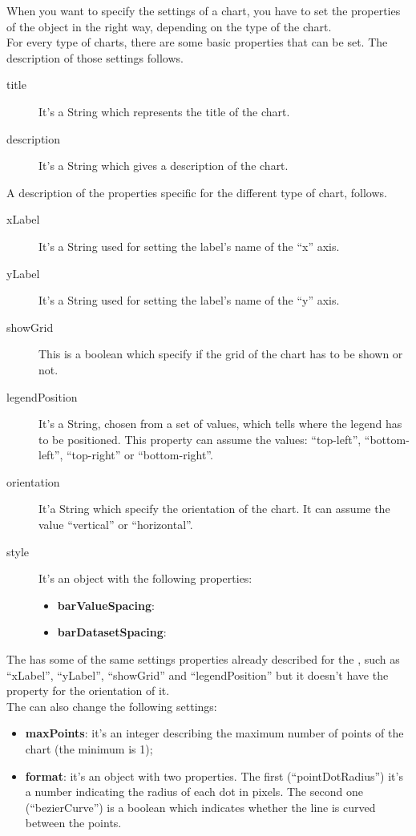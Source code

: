 	When you want to specify the settings of a chart, you have to set the properties of the  object in the right way, depending on the type of the chart.\\
	For every type of charts, there are some basic properties that can be set. The description of those settings follows.
	\begin{description}
			\item[title] It's a String which represents the title of the chart.
			\item[description] It's a String which gives a description of the chart.
	\end{description}
	A description of the properties specific for the different type of chart, follows.
		\begin{description}
			\item[xLabel] It's a String used for setting the label's name of the “x” axis.
			\item[yLabel] It's a String used for setting the label's name of the “y” axis.
			\item[showGrid] This is a boolean which specify if the grid of the chart has to be shown or not.
			\item[legendPosition] It's a String, chosen from a set of values, which tells where the legend has to be positioned. This property can assume the values: “top-left”, “bottom-left”, “top-right” or “bottom-right”.
			\item[orientation] It'a String which specify the orientation of the chart. It can assume the value “vertical” or “horizontal”.
			\item[style] It's an object with the following properties:
			\begin{itemize}
				\item \textbf{barValueSpacing}: 
				\item \textbf{barDatasetSpacing}:
			\end{itemize}
		\end{description}
		The  has some of the same settings properties already described for the , such as “xLabel”, “yLabel”, “showGrid” and “legendPosition” but it doesn't have the property for the orientation of it. \\
		The  can also change the following settings:
		\begin{itemize}
			\item \textbf{maxPoints}: it's an integer describing the maximum number of points of the chart (the minimum is 1);
			\item \textbf{format}: it's an object with two properties. The first (“pointDotRadius”) it's a number indicating the radius of each dot in pixels. The second one (“bezierCurve”) is a boolean which indicates whether the line is curved between the points.
		\end{itemize}
